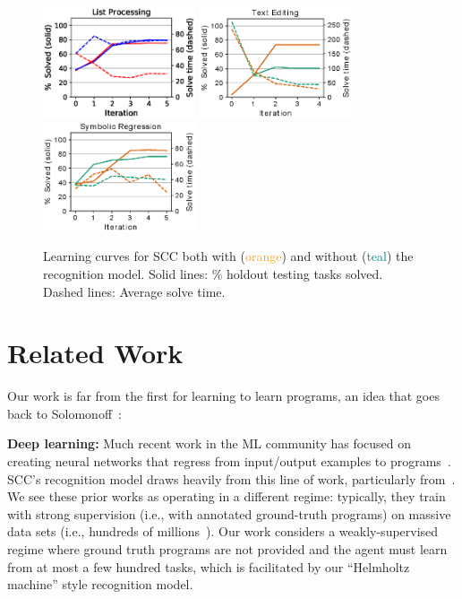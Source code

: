 \documentclass{article}
\newcommand{\system}{\textsc{SCC} }
\newcommand{\systemEnding}{\textsc{SCC}}
\newcommand{\orange}[1]{\textcolor{orange}{#1}}
\newcommand{\teal}[1]{\textcolor{teal}{#1}}
\begin{document}
\begin{figure}\centering
  \includegraphics[width = 4.5cm]{figures/listLearningCurve.eps}
  \includegraphics[width = 4.5cm]{figures/textLearningCurve.eps}        
  \includegraphics[width = 4.5cm]{figures/rationalCurve.eps}   
  \caption{Learning curves for \system both with (\orange{orange}) and without
  (\teal{teal}) the recognition model. Solid lines: \% holdout testing tasks solved. Dashed lines: Average solve time.}\label{learningCurves} 
\end{figure}

\section{Related Work}
 Our work is far from the first for learning to learn programs,
 an idea that goes back to Solomonoff~\cite{solomonoff1989system}:

 \noindent \textbf{Deep learning:} Much recent work in the ML community has
 focused on creating neural networks that regress from
 input/output examples to programs~\cite{devlin2017robustfill,devlin2017neural,menon2013machine,balog2016deepcoder}. %
\systemEnding's recognition model draws heavily from this line of work, particularly from~\cite{menon2013machine}.
We see these prior works as operating in a different regime: typically, they train with strong supervision (i.e., with annotated ground-truth programs) on massive data sets (i.e., hundreds of millions~\cite{devlin2017robustfill}).
 Our work   considers a weakly-supervised regime where ground truth programs are not provided and
 the agent must learn from at most a few hundred tasks,
 which is facilitated by our ``Helmholtz machine'' style recognition model.%
 
\end{document}
